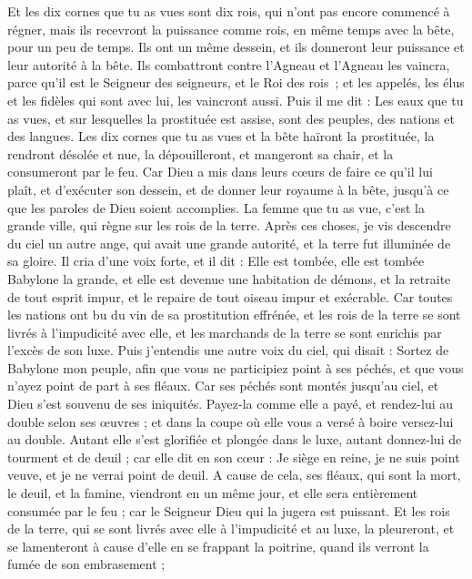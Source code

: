 \begin{multicols}{2}
Et les dix cornes que tu as vues sont dix rois, qui n'ont pas encore commencé à régner, mais ils recevront la puissance comme rois, en même temps avec la bête, pour un peu de temps.
Ils ont un même dessein, et ils donneront leur puissance et leur autorité à la bête.
Ils combattront contre l'Agneau et l'Agneau les vaincra, parce qu'il est le Seigneur des seigneurs, et le Roi des rois ; et les appelés, les élus et les fidèles qui sont avec lui, les vaincront aussi.
Puis il me dit : Les eaux que tu as vues, et sur lesquelles la prostituée est assise, sont des peuples, des nations et des langues.
Les dix cornes que tu as vues et la bête haïront la prostituée, la rendront désolée et nue, la dépouilleront, et mangeront sa chair, et la consumeront par le feu.
Car Dieu a mis dans leurs cœurs de faire ce qu'il lui plaît, et d’exécuter son dessein, et de donner leur royaume à la bête, jusqu'à ce que les paroles de Dieu soient accomplies.
La femme que tu as vue, c'est la grande ville, qui règne sur les rois de la terre.
\VerseOne{}Après ces choses, je vis descendre du ciel un autre ange, qui avait une grande autorité, et la terre fut illuminée de sa gloire.
Il cria d’une voix forte, et il dit : Elle est tombée, elle est tombée Babylone la grande, et elle est devenue une habitation de démons, et la retraite de tout esprit impur, et le repaire de tout oiseau impur et exécrable.
Car toutes les nations ont bu du vin de sa prostitution effrénée, et les rois de la terre se sont livrés à l’impudicité avec elle, et les marchands de la terre se sont enrichis par l'excès de son luxe.
Puis j'entendis une autre voix du ciel, qui disait : Sortez de Babylone mon peuple, afin que vous ne participiez point à ses péchés, et que vous n’ayez point de part à ses fléaux.
Car ses péchés sont montés jusqu'au ciel, et Dieu s'est souvenu de ses iniquités.
Payez-la comme elle a payé, et rendez-lui au double selon ses œuvres ; et dans la coupe où elle vous a versé à boire versez-lui au double.
Autant elle s'est glorifiée et plongée dans le luxe, autant donnez-lui de tourment et de deuil ; car elle dit en son cœur : Je siège en reine, je ne suis point veuve, et je ne verrai point de deuil.
A cause de cela, ses fléaux, qui sont la mort, le deuil, et la famine, viendront en un même jour, et elle sera entièrement consumée par le feu ; car le Seigneur Dieu qui la jugera est puissant.
Et les rois de la terre, qui se sont livrés avec elle à l’impudicité et au luxe, la pleureront, et se lamenteront à cause d’elle en se frappant la poitrine, quand ils verront la fumée de son embrasement ;

\end{multicols}
